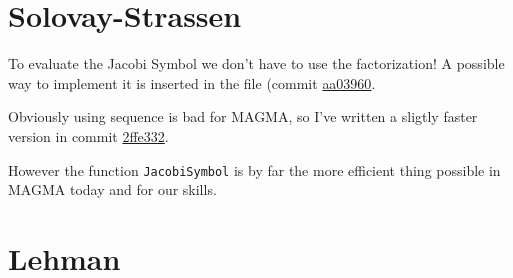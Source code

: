 \documentclass{article}
\theoremstyle{plain}
\theoremstyle{remark}
\theoremstyle{definition}
\begin{document}
\section{Solovay-Strassen}


To evaluate the Jacobi Symbol we don't have to use the factorization! A possible way to implement it is inserted in the file (commit \href{https://github.com/giacomoborin/project2_MAGMA/commit/aa03960b86ec942f5f35c55e297850a3e2b2beba}{aa03960}.

Obviously using sequence is bad for MAGMA, so I've written a sligtly faster version in commit \href{https://github.com/giacomoborin/project2_MAGMA/commit/2ffe332f8ee782b20a079694f1c1cf9363aae3d0}{2ffe332}.


However the function \verb|JacobiSymbol| is by far the more efficient thing possible in MAGMA today and for our skills. 


\section{Lehman}

\appendix


\newpage
\printbibliography
\end{document}
